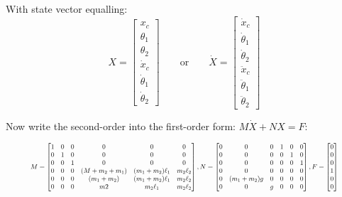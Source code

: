 \documentclass[10pt]{article}
\begin{document}
    With state vector equalling:
    \begin{equation}
        X=
        \begin{bmatrix}
            x_c\\
            \theta_1\\
            \theta_2\\
            \dot x_c\\
            \dot \theta_1\\
            \dot \theta_2
        \end{bmatrix}   
        \qquad\text{or}\qquad\dot X=
        \begin{bmatrix}
            \dot x_c\\
            \dot \theta_1\\
            \dot \theta_2\\
            \ddot x_c\\
            \ddot \theta_1\\
            \ddot \theta_2
        \end{bmatrix}   
    \end{equation}

    Now write the second-order into the first-order form: $M \dot X + NX = F$:

    \begin{equation}
        \resizebox{.9\textwidth}{!}{$
        M=
        \begin{bmatrix}
            1&0&0&0&0&0\\
            0&1&0&0&0&0\\
            0&0&1&0&0&0\\
            0&0&0&(M+m_2+m_1) & (m_1+m_2)\ell_1         & m_2\ell_2\\
            0&0&0&(m_1 + m_2)      & (m_1+m_2)\ell_1            &  m_2\ell_2\\
            0&0&0&m2     & m_2\ell_1   & m_2\ell_2
        \end{bmatrix}
        ,N =
        \begin{bmatrix}
            0&0&0&1&0&0\\
            0&0&0&0&1&0\\
            0&0&0&0&0&1\\
            0&0&0&0&0&0\\
            0&(m_1 +m_2)g&0&0&0&0\\
            0&0& g &0&0&0
        \end{bmatrix}
        ,F=
        \begin{bmatrix}
            0\\
            0\\
            0\\
            1\\
            0\\
            0\\
        \end{bmatrix}$}
    \end{equation}
\end{document}
